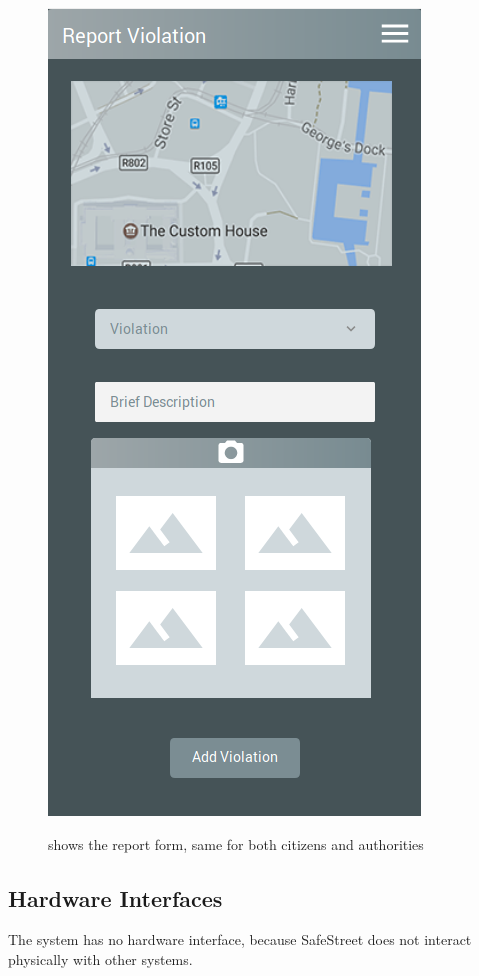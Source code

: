 \documentclass[../RASD.tex]{subfiles}
\begin{document}
    \begin{figure}[H]
        \centering
        \includegraphics[scale = 0.4]{assets/report.png}\\[1.6 cm]
        \caption[Report a violation \textit{Mockup}]{shows the report form, same for both citizens and authorities}
    \end{figure}
            \subsection{Hardware Interfaces}\label{subsec:hardware-interfaces}
        The system has no hardware interface, because SafeStreet does not interact physically with other systems.
\end{document}
